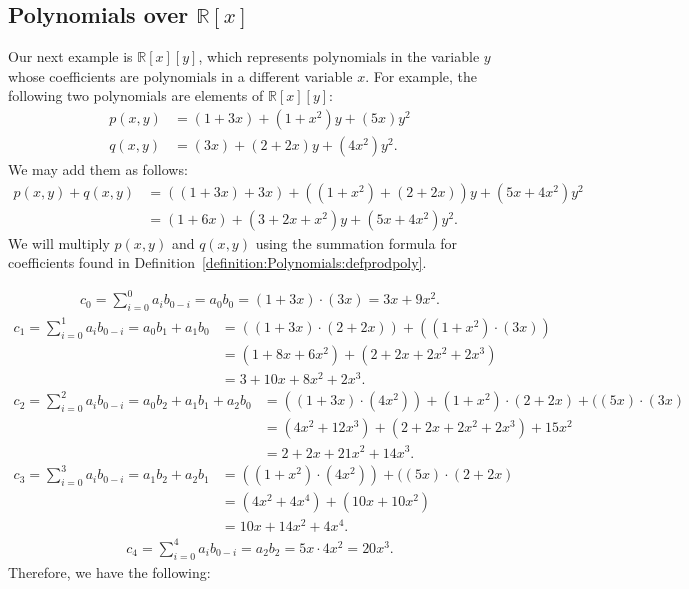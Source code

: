 \subsection*{Polynomials over $\mathbb{R}[x]$}

Our next example is $\mathbb{R}[x][y]$, which represents polynomials in the variable $y$ whose coefficients are polynomials in a different variable $x$.  For example, the following two polynomials are elements of  $\mathbb{R}[x][y]$:
\begin{align*} 
p(x,y) & = (1+3x)+(1+x^2)y+(5x)y^2\\
q(x,y) & = (3x)+(2+2x)y+(4x^2)y^2.
\end{align*}
We may add them as follows:
\begin{align*}
p(x,y) + q(x,y) &=((1+3x)+3x)+((1+x^2)+(2+2x))y+(5x+4x^2)y^2\\
&= (1+6x)+(3+2x+x^2)y+(5x+4x^2 )y^2.
\end{align*}
We will multiply $p(x,y)$ and $q(x,y)$ using the summation formula for coefficients found in Definition~\ref{definition:Polynomials:defprodpoly}.

\begin{align*}
 c_0 = \sum_{i = 0}^0 a_i b_{0 - i} = a_0b_0= (1+3x) \cdot (3x)= 3x+9x^2. 
\end{align*}
\begin{align*}
 c_1 = \sum_{i = 0}^1 a_i b_{0 - i} = a_0b_1+a_1b_0&= ((1+3x) \cdot (2+2x))+((1+x^2)\cdot (3x))\\
&=(1+8x+6x^2)+(2+2x+2x^2+2x^3)\\
&=3+10x+8x^2+2x^3. 
\end{align*}
\begin{align*}
 c_2 = \sum_{i = 0}^2 a_i b_{0 - i} = a_0b_2+a_1b_1+a_2b_0&=((1+3x) \cdot (4x^2))+(1+x^2)\cdot(2+2x)+((5x)\cdot(3x)\\
&= (4x^2+12x^3)+(2+2x+2x^2+2x^3)+15x^2\\
&=2+2x+21x^2+14x^3. 
\end{align*}
\begin{align*}
c_3 = \sum_{i = 0}^3 a_i b_{0 - i} = a_1b_2+a_2b_1&= ((1+x^2) \cdot (4x^2))+((5x)\cdot(2+2x)\\
&=  (4x^2+4x^4)+(10x+10x^2)\\
&=10x+14x^2+4x^4. 
\end{align*}
\begin{align*}
 c_4 = \sum_{i = 0}^4 a_i b_{0 - i} = a_2b_2= 5x \cdot 4x^2= 20x^3. 
\end{align*}
Therefore, we have the following:

